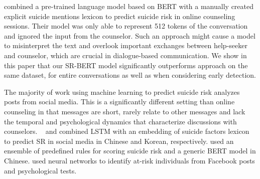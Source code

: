 \documentclass[letterpaper]{article} %
\begin{document}
\citet{amir}  combined a pre-trained language model based on BERT \cite{devlin2018bert} with a manually created explicit suicide mentions lexicon to predict suicide risk in online counseling sessions. Their model was only able to represent 512 tokens of the conversation and ignored the input from the counselor.
Such an approach might cause a model to misinterpret the text and overlook important exchanges between help-seeker and counselor, which are crucial in dialogue-based communication.
We show in this paper that our  SR-BERT model significantly outperforms \citet{amir} approach on the same dataset, for entire conversations as well as when considering early detection.



The majority of work using machine learning to predict  suicide risk analyzes posts from social media.
This is a significantly  different setting than online counseling  in that  messages  are short, rarely relate to other messages and lack the  temporal and psychological dynamics that characterize discussions with counselors.
~\citet{caoLatentSuicideRisk2019} and \citet{lee2020cross}  combined  LSTM  with an embedding of  suicide factors lexicon to predict SR in social media in Chinese and Korean, respectively.
\citet{wangMedicalLevelSuicideRisk2021}  used an ensemble of predefined rules for scoring suicide risk  and a generic BERT model in Chinese.
 \citet{ophirDeepNeuralNetworks2020} used neural networks to identify at-risk individuals from Facebook posts and psychological tests.
\end{document}
